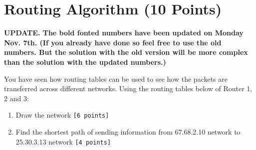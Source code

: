 \documentclass{WeSTassignment}
\begin{document}

\section{Routing Algorithm (10 Points)}
\textbf{UPDATE. The bold fonted numbers have been updated on Monday Nov. 7th. (If you already have done so feel free to use the old numbers. But the solution with the old version will be more complex than the solution with the updated numbers.)}

You have seen how routing tables can be used to see how the packets are transferred across different networks. Using the routing tables below of Router 1, 2 and 3:
\begin{enumerate}
\item Draw the network \texttt{[6 points]}
\item Find the shortest path of sending information from 67.68.2.10 network to 25.30.3.13 network \texttt{[4 points]}
\end{enumerate}
\end{document}
